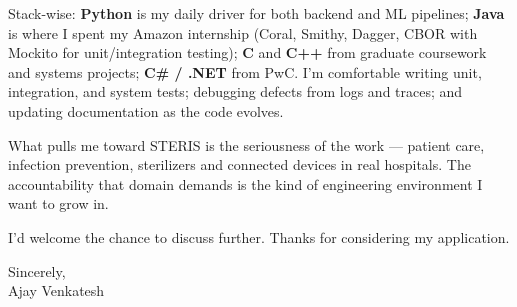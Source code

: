 \documentclass[letterpaper,11pt]{article}
\begin{document}
Stack-wise: \textbf{Python} is my daily driver for both backend and ML pipelines; \textbf{Java} is where I spent my Amazon internship (Coral, Smithy, Dagger, CBOR with Mockito for unit/integration testing); \textbf{C} and \textbf{C++} from graduate coursework and systems projects; \textbf{C\# / .NET} from PwC. I'm comfortable writing unit, integration, and system tests; debugging defects from logs and traces; and updating documentation as the code evolves.

What pulls me toward STERIS is the seriousness of the work --- patient care, infection prevention, sterilizers and connected devices in real hospitals. The accountability that domain demands is the kind of engineering environment I want to grow in.

I'd welcome the chance to discuss further. Thanks for considering my application.

\vspace{12pt}

Sincerely, \\
Ajay Venkatesh
\end{document}
